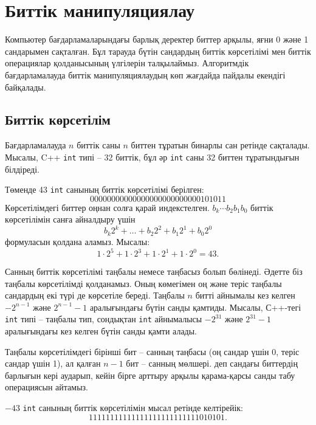\chapter{Биттік манипуляциялау}

Компьютер бағдарламаларындағы барлық деректер 
биттер арқылы, яғни 0 және 1 сандарымен сақталған.
Бұл тарауда бүтін сандардың биттік көрсетілімі мен 
биттік операциялар қолданысының үлгілерін талқылаймыз.
Алгоритмдік бағдарламалауда биттік манипуляциялаудың көп жағдайда
пайдалы екендігі байқалады. 

\section{Биттік көрсетілім}


Бағдарламалауда $n$ биттік саны $n$ биттен тұратын бинарлы сан ретінде сақталады.
Мысалы, C++ \texttt{int} типі -- 32 биттік, 
бұл әр \texttt{int} саны 32 биттен тұратындығын білдіреді.

Төменде 43 \texttt{int} санының биттік көрсетілімі берілген:
\[00000000000000000000000000101011\]
Көрсетілімдегі биттер оңнан солға қарай индекстелген.
$b_k \cdots b_2 b_1 b_0$ биттік көрсетілімін 
санға айналдыру үшін \[b_k 2^k + \ldots + b_2 2^2 + b_1 2^1 + b_0 2^0\] формуласын қолдана аламыз. 
Мысалы:
\[1 \cdot 2^5 + 1 \cdot 2^3 + 1 \cdot 2^1 + 1 \cdot 2^0 = 43.\]

Санның биттік көрсетілімі таңбалы немесе таңбасыз болып бөлінеді.
Әдетте біз таңбалы көрсетілімді қолданамыз. Оның көмегімен
оң және теріс  таңбалы сандардың екі түрі де көрсетіле береді.
Таңбалы $n$ битті айнымалы кез келген $-2^{n-1}$ және $2^{n-1}-1$
аралығындағы бүтін санды қамтиды. Мысалы, С++-тегі \texttt{int} типі --
таңбалы тип, сондықтан \texttt{int} айнымалысы $-2^{31}$ және $2^{31}-1$
аралығындағы кез келген бүтін санды қамти алады.

Таңбалы көрсетілімдегі бірінші бит -- санның таңбасы
(оң сандар үшін 0, теріс сандар үшін 1),  
ал қалған $n-1$ бит -- санның мөлшері.
 деп сандағы 
биттердің барлығын кері аударып, кейін бірге арттыру
арқылы қарама-қарсы санды табу операциясын айтамыз. %

$-43$ \texttt{int} санының   
биттік көрсетілімін мысал ретінде келтірейік: 
\[11111111111111111111111111010101.\]

